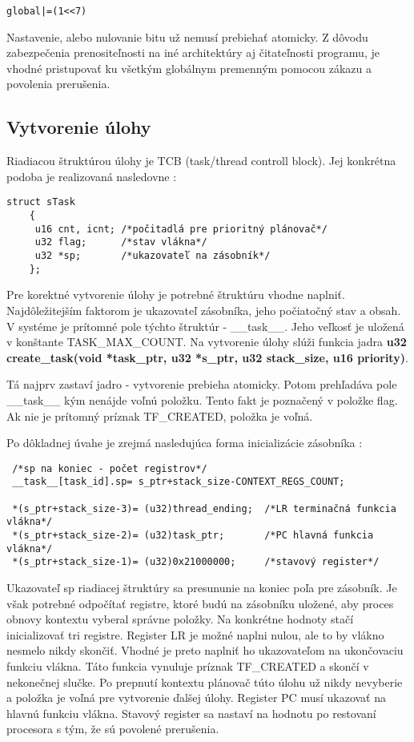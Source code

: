 {\small
\begin{verbatim}
global|=(1<<7)
\end{verbatim}
}

Nastavenie, alebo nulovanie bitu už nemusí prebiehať atomicky. Z dôvodu zabezpečenia prenositeľnosti na iné architektúry aj čitateľnosti programu, je vhodné pristupovať ku všetkým globálnym premenným pomocou zákazu a povolenia prerušenia. 

\subsection{Vytvorenie úlohy}

Riadiacou štruktúrou úlohy je TCB (task/thread controll block). Jej konkrétna podoba je realizovaná nasledovne :
{\small
\begin{verbatim}
struct sTask
	{
	 u16 cnt, icnt; /*počitadlá pre prioritný plánovač*/
	 u32 flag;      /*stav vlákna*/
	 u32 *sp;       /*ukazovateľ na zásobník*/
	};
\end{verbatim}
}

Pre korektné vytvorenie úlohy je potrebné štruktúru vhodne naplniť. Najdôležitejším faktorom je ukazovateľ zásobníka, jeho počiatočný stav a obsah. V systéme je prítomné pole týchto štruktúr - \_\_task\_\_. Jeho veľkosť je uložená v konštante TASK\_MAX\_COUNT. Na vytvorenie úlohy slúži funkcia jadra \textbf{u32 create\_task(void *task\_ptr, u32 *s\_ptr, u32 stack\_size, u16 priority)}.

Tá najprv zastaví jadro - vytvorenie prebieha atomicky. Potom prehľadáva pole \_\_task\_\_ kým nenájde voľnú položku. Tento fakt je poznačený v položke flag. Ak nie je prítomný príznak TF\_CREATED, položka je voľná.

Po dôkladnej úvahe je zrejmá nasledujúca forma inicializácie zásobníka :
{\small
\begin{verbatim}
 /*sp na koniec - počet registrov*/
 __task__[task_id].sp= s_ptr+stack_size-CONTEXT_REGS_COUNT;
 
 *(s_ptr+stack_size-3)= (u32)thread_ending;  /*LR terminačná funkcia vlákna*/
 *(s_ptr+stack_size-2)= (u32)task_ptr;       /*PC hlavná funkcia vlákna*/
 *(s_ptr+stack_size-1)= (u32)0x21000000;     /*stavový register*/
\end{verbatim}
}

Ukazovateľ sp riadiacej štruktúry sa presununie na koniec poľa pre zásobník. Je však potrebné odpočítať registre, ktoré budú na zásobníku uložené, aby proces obnovy kontextu vyberal správne položky.
Na konkrétne hodnoty stačí inicializovať tri registre. Register LR je možné naplni nulou, ale to by vlákno nesmelo nikdy skončiť. Vhodné je preto naplniť ho ukazovateľom na ukončovaciu funkciu vlákna. Táto funkcia vynuluje príznak TF\_CREATED a skončí v nekonečnej slučke. Po prepnutí kontextu plánovač túto úlohu už nikdy nevyberie a položka je voľná pre vytvorenie ďalšej úlohy.
Register PC musí ukazovať na hlavnú funkciu vlákna. Stavový register sa nastaví na hodnotu po restovaní procesora s tým, že sú povolené prerušenia.


